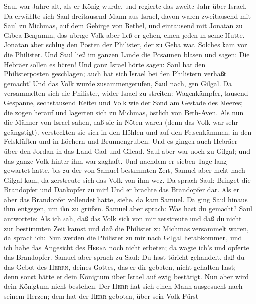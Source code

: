  Saul war Jahre alt, als er König wurde, und regierte das
zweite Jahr über Israel.  Da erwählte sich Saul
dreitausend Mann aus Israel, davon waren zweitausend mit Saul zu
Michmas, auf dem Gebirge von Bethel, und eintausend mit Jonatan zu
Gibea-Benjamin, das übrige Volk aber ließ er gehen, einen jeden in seine
Hütte.  Jonatan aber schlug den Posten der Philister, der
zu Geba war. Solches kam vor die Philister. Und Saul ließ im ganzen
Lande die Posaunen blasen und sagen: Die Hebräer sollen es hören!
 Und ganz Israel hörte sagen: Saul hat den Philisterposten
geschlagen; auch hat sich Israel bei den Philistern verhaßt gemacht! Und
das Volk wurde zusammengerufen, Saul nach, gen Gilgal.  Da
versammelten sich die Philister, wider Israel zu streiten: Wagenkämpfer,
tausend Gespanne, sechstausend Reiter und Volk wie der Sand am Gestade
des Meeres; die zogen herauf und lagerten sich zu Michmas, östlich von
Beth-Aven.  Als nun die Männer von Israel sahen, daß sie
in Nöten waren (denn das Volk war sehr geängstigt), versteckten sie sich
in den Höhlen und auf den Felsenkämmen, in den Felsklüften und in
Löchern und Brunnengruben.  Und es gingen auch Hebräer
über den Jordan in das Land Gad und Gilead. Saul aber war noch zu
Gilgal; und das ganze Volk hinter ihm war zaghaft.  Und
nachdem er sieben Tage lang gewartet hatte, bis zu der von Samuel
bestimmten Zeit, Samuel aber nicht nach Gilgal kam, da zerstreute sich
das Volk von ihm weg.  Da sprach Saul: Bringet die
Brandopfer und Dankopfer zu mir! Und er brachte das Brandopfer dar.
 Als er aber das Brandopfer vollendet hatte, siehe, da
kam Samuel. Da ging Saul hinaus ihm entgegen, um ihn zu grüßen.
 Samuel aber sprach: Was hast du gemacht? Saul
antwortete: Als ich sah, daß das Volk sich von mir zerstreute und daß du
nicht zur bestimmten Zeit kamst und daß die Philister zu Michmas
versammelt waren,  da sprach ich: Nun werden die
Philister zu mir nach Gilgal herabkommen, und ich habe das Angesicht des
\textsc{Herrn} noch nicht erbeten; da wagte ich's und opferte das
Brandopfer.  Samuel aber sprach zu Saul: Du hast töricht
gehandelt, daß du das Gebot des \textsc{Herrn}, deines Gottes, das er
dir geboten, nicht gehalten hast; denn sonst hätte er dein Königtum über
Israel auf ewig bestätigt.  Nun aber wird dein Königtum
nicht bestehen. Der \textsc{Herr} hat sich einen Mann ausgesucht nach
seinem Herzen; dem hat der \textsc{Herr} geboten, über sein Volk Fürst
